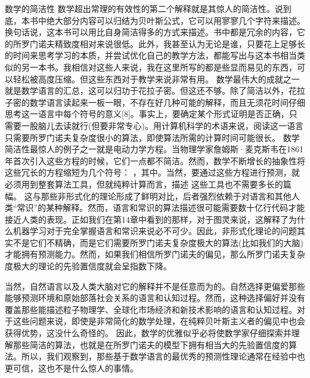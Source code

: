 数学的简洁性
数学超出常理的有效性的第二个解释就是其惊人的简洁性。说到底，本书中绝大部分内容可以归结为贝叶斯公式，它可以用寥寥几个字符来描述。换句话说，这本书可以用比自身简洁得多的方式来描述。书中都是冗余的内容，它的所罗门诺夫精致度相对来说很低。此外，我甚至认为无论是谁，只要花上足够长的时间来思考学习的本质，并尝试优化自己的教学方法，都能写出与这本书相当类似的另一本书。我相信对这些人来说，我在这里所写的都是些显而易见的东西，可以轻松被高度压缩。但这些东西对于教学来说非常有用。
数学最伟大的成就之一就是数学语言的汇总，这可以归功于花拉子密。但这还不够。除了简洁以外，花拉子密的数学语言读起来一板一眼，不存在好几种可能的解释，而且无须花时间仔细思考这一语言中每个符号的意义[8]。事实上，要确定某个形式证明是否正确，只需要一股脑儿去读就行(但要非常专心)。用计算机科学的术语来说，阅读这一语言只需要所罗门诺夫复杂度很小的算法，即使算法所需的计算时间可能很长。
数学简洁性最惊人的例子之一就是电动力学方程。当物理学家詹姆斯·麦克斯韦在1861年首次引入这些方程的时候，它们一点都不简洁。然而，数学不断增长的抽象性将这些冗长的方程缩短为几个符号：
，其中。当然，要通过这些方程进行预测，就必须用到整套算法工具，但就纯粹计算而言，描述
这些工具也不需要多长的篇幅。
这与那些非形式化的理论形成了鲜明对比，后者强烈依赖于对语言和其他人类“常识”的某种解释。然而，语言和常识的算法描述很可能需要数十亿行代码才能接近人类的表现。正如我们在第14章中看到的那样，对于图灵来说，这解释了为什么机器学习对于完全掌握语言和常识来说必不可少。因此，非形式化理论的问题其实不是它们不精确，而是它们需要所罗门诺夫复杂度极大的算法(比如我们的大脑)才能拥有预测能力。然而，如果我们相信所罗门诺夫的偏见，那么所罗门诺夫复杂度极大的理论的先验置信度就会呈指数下降。

当然，自然语言以及人类大脑对它的解释并不是任意而为的。自然选择更偏爱那些能够预测环境和原始部落社会关系的语言和认知过程。然而，这种选择偏好并没有覆盖那些能描述粒子物理学、全球化市场经济和新技术影响的语言和认知过程。对于这些问题来说，即使是非常简化的数学处理，在纯粹贝叶斯主义者的偏见中也会获得优势，这没什么奇怪的。
因此，数学的优雅似乎必将使数学家仔细探索并理解那些简洁的算法，也就是在所罗门诺夫的模型下拥有相当大的先验置信度的算法。所以，我们观察到，那些基于数学语言的最优秀的预测性理论通常在经验中也更可信，这也不是什么惊人的事情。

